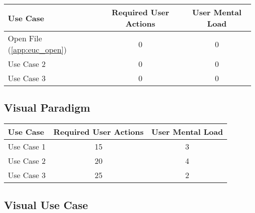 \begin{tabularx}{\textwidth}{Xcc}
\textbf{Use Case} & \textbf{Required User Actions} & \textbf{User Mental Load}\\
\hline
Open File (\ref{app:euc_open}) & 0 & 0 \\
Use Case 2                     & 0 & 0 \\
Use Case 3                     & 0 & 0
\end{tabularx}

\subsection*{Visual Paradigm}




\begin{tabularx}{\textwidth}{Xcc}
\textbf{Use Case} & \textbf{Required User Actions} & \textbf{User Mental Load}\\
\hline
Use Case 1                          & 15 & 3 \\
Use Case 2                          & 20 & 4 \\
Use Case 3                          & 25 & 2
\end{tabularx}

\subsection*{Visual Use Case}

